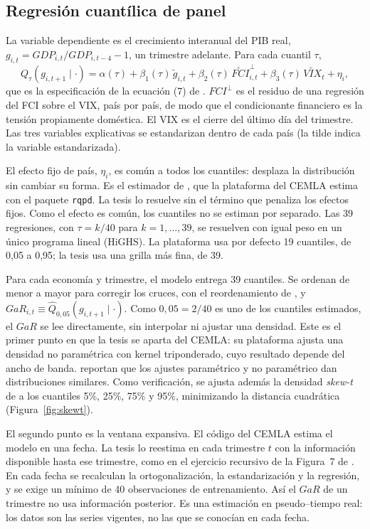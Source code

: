\subsection{Regresión cuantílica de panel}

La variable dependiente es el crecimiento interanual del PIB real, $g_{i,t}=GDP_{i,t}/GDP_{i,t-4}-1$, un trimestre adelante. Para cada cuantil $\tau$,
\[ Q_\tau\!\left(g_{i,t+1}\mid\cdot\right)=\alpha(\tau)+\beta_1(\tau)\,\tilde g_{i,t}+\beta_2(\tau)\,\widetilde{FCI}^{\perp}_{i,t}+\beta_3(\tau)\,\widetilde{VIX}_t+\eta_i, \]
que es la especificación de la ecuación (7) de \citet{OssandonBusch2022}. $FCI^{\perp}$ es el residuo de una regresión del FCI sobre el VIX, país por país, de modo que el condicionante financiero es la tensión propiamente doméstica. El VIX es el cierre del último día del trimestre. Las tres variables explicativas se estandarizan dentro de cada país (la tilde indica la variable estandarizada).

El efecto fijo de país, $\eta_i$, es común a todos los cuantiles: desplaza la distribución sin cambiar su forma. Es el estimador de \citet{Koenker2004}, que la plataforma del CEMLA estima con el paquete \texttt{rqpd}. La tesis lo resuelve sin el término que penaliza los efectos fijos. Como el efecto es común, los cuantiles no se estiman por separado. Las 39 regresiones, con $\tau=k/40$ para $k=1,\dots,39$, se resuelven con igual peso en un único programa lineal (HiGHS). La plataforma usa por defecto 19 cuantiles, de 0,05 a 0,95; la tesis usa una grilla más fina, de 39.

Para cada economía y trimestre, el modelo entrega 39 cuantiles. Se ordenan de menor a mayor para corregir los cruces, con el reordenamiento de \citet{ChernozhukovEtAl2010}, y $GaR_{i,t}\equiv\hat Q_{0{,}05}(g_{i,t+1}\mid\cdot)$. Como $0{,}05=2/40$ es uno de los cuantiles estimados, el $GaR$ se lee directamente, sin interpolar ni ajustar una densidad. Este es el primer punto en que la tesis se aparta del CEMLA: su plataforma ajusta una densidad no paramétrica con kernel triponderado, cuyo resultado depende del ancho de banda. \citet{OssandonBusch2022} reportan que los ajustes paramétrico y no paramétrico dan distribuciones similares. Como verificación, se ajusta además la densidad \textit{skew-t} de \citet{ABG2019b} a los cuantiles 5\%, 25\%, 75\% y 95\%, minimizando la distancia cuadrática (Figura~\ref{fig:skewt}).

El segundo punto es la ventana expansiva. El código del CEMLA estima el modelo en una fecha. La tesis lo reestima en cada trimestre $t$ con la información disponible hasta ese trimestre, como en el ejercicio recursivo de la Figura~7 de \citet{OssandonBusch2022}. En cada fecha se recalculan la ortogonalización, la estandarización y la regresión, y se exige un mínimo de 40 observaciones de entrenamiento. Así el $GaR$ de un trimestre no usa información posterior. Es una estimación en pseudo--tiempo real: los datos son las series vigentes, no las que se conocían en cada fecha.

